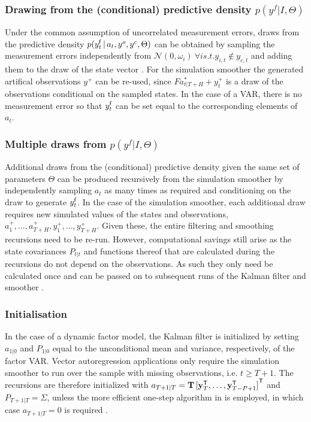 \documentclass[notitlepage,a4paper,12pt]{article}
\newcommand{\transpose}[1]{{#1}^{\sf{T}}}
\begin{document}
\begin{ThreePartTable}
\subsubsection{Drawing from the (conditional) predictive density $p(y^f|I, \Theta)$}
Under the common assumption of uncorrelated measurement errors, draws from the predictive density $p(y^{\sf{f}}_t\,|\,a_t, y^o, y^c, \Theta)$ can  be obtained by sampling the measurement errors independently from $\mathcal{N}(0, \omega_i) \: \forall i s.t. y_{i,t} \notin y_{c,t}$ and adding them to the draw of the state vector \citep[see][for the general case of a full covariance matrix $\Omega$]{bgl_2015ijf}. For the \citet{durbinkoopman2002_biomtr} simulation smoother the generated artifical observations $y^+$ can be re-used, since $F a^*_{t|T+H} + y^+_t$ is a draw of the observations conditional on the sampled states. In the case of a VAR, there is no 
measurement error so that $y^{\sf{f}}_t$ can be set equal to the corresponding elements of $a_t$. 

\subsubsection{Multiple draws from $p(y^f|I, \Theta)$}
Additional draws from the (conditional) predictive density given the same set of parameters $\Theta$ can be produced recursively from the \citet{carterkohn1994_biomtr} simulation smoother by independently sampling $a_t$ as many times as required and conditioning on the draw to generate $y^{\sf{f}}_t$. In the case of the \citet{durbinkoopman2002_biomtr} simulation smoother, each additional draw requires new simulated values of the states and observations, $a^+_1, \dots, a^+_{T+H}, y^+_1, \dots, y^+_{T+H}$. Given these, the entire filtering and smoothing recursions need to be re-run. However, computational savings still arise as the state covariances $P_{t|t}$ and functions thereof that are calculated during the recursions do not depend on the observations. As such they only need be calculated once and can be passed on to subsequent runs of the Kalman filter and smoother \citep[p. 606]{durbinkoopman2002_biomtr}.

\subsubsection{Initialisation}

In the case of a dynamic factor model, the Kalman filter is initialized by setting $a_{1|0}$ and $P_{1|0}$ equal to the unconditional mean and variance, respectively, of the factor VAR. Vector autoregression applications only require the simulation smoother to run over the sample with missing observations, i.e. $t\geq T+1$. The recursions are therefore initialized with $a_{T+1|T} = \mathbf{T} \, \transpose{[\transpose{\mathbf{y}}_T, \dots, \transpose{\mathbf{y}}_{T-P+1}]}$ and $P_{T+1|T} = \Sigma$, unless the more efficient one-step algorithm in \citet{durbinkoopman2002_biomtr} is employed, in which case $a_{T+1|T} = 0$ is required \citep[see][]{jarocinski2015csda}.


\end{ThreePartTable}
\end{document}
